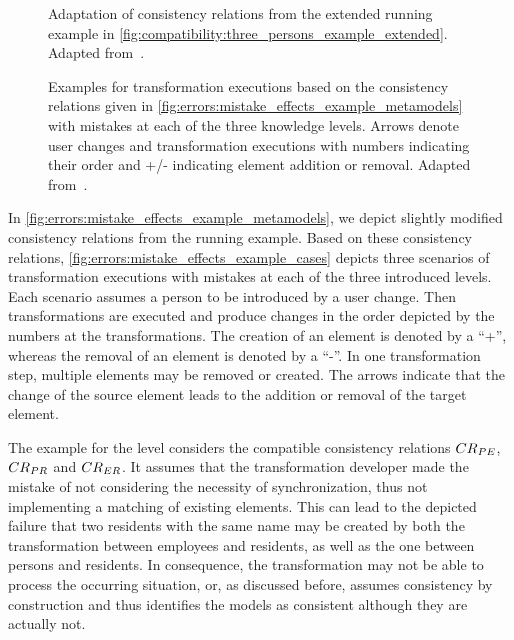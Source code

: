 \begin{figure}
    \centering
    
    \caption[Adaptation of consistency relations from running example]{Adaptation of consistency relations from the extended running example in \autoref{fig:compatibility:three_persons_example_extended}. Adapted from~.}
    \label{fig:errors:mistake_effects_example_metamodels}
\end{figure}

\begin{figure}
    \centering
    
    \caption[Examples for mistakes at different knowledge levels]{Examples for transformation executions based on the consistency relations given in \autoref{fig:errors:mistake_effects_example_metamodels} with mistakes at each of the three knowledge levels. Arrows denote user changes and transformation executions with numbers indicating their order and +/- indicating element addition or removal. Adapted from~.}
    \label{fig:errors:mistake_effects_example_cases}
\end{figure}

In \autoref{fig:errors:mistake_effects_example_metamodels}, we depict slightly modified consistency relations from the running example.
Based on these consistency relations, \autoref{fig:errors:mistake_effects_example_cases} depicts three scenarios of transformation executions with mistakes at each of the three introduced levels.
Each scenario assumes a person to be introduced by a user change.
Then transformations are executed and produce changes in the order depicted by the numbers at the transformations.
The creation of an element is denoted by a \enquote{+}, whereas the removal of an element is denoted by a \enquote{-}.
In one transformation step, multiple elements may be removed or created.
The arrows indicate that the change of the source element leads to the addition or removal of the target element.

The example for the \leveltransformation level considers the compatible consistency relations $\consistencyrelation{CR}{PE}$, $\consistencyrelation{CR}{PR}$ and $\consistencyrelation{CR}{ER}$. It assumes that the transformation developer made the mistake of not considering the necessity of synchronization, thus not implementing a matching of existing elements.
This can lead to the depicted failure that two residents with the same name may be created by both the transformation between employees and residents, as well as the one between persons and residents.
In consequence, the transformation may not be able to process the occurring situation, or, as discussed before,  assumes consistency by construction and thus identifies the models as consistent although they are actually not.

